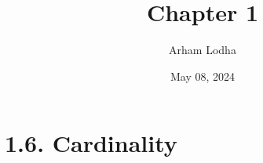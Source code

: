 \documentclass{article}
\newcommand{\Z}{\mathbb{Z}}
\newcommand{\N}{\mathbb{N}}
\newcommand{\abs}[1]{\left\lvert #1\right\rvert}
\begin{document}
\title{Chapter 1}
\author{Arham Lodha}%
\date{May 08, 2024}%
\maketitle

\section*{1.6. Cardinality}
    

    
    

\end{document}
